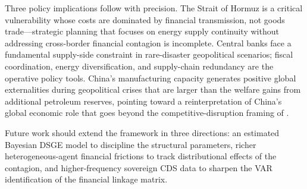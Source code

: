 \documentclass[12pt]{article}
\begin{document}
Three policy implications follow with precision. The Strait of Hormuz is a critical vulnerability whose costs are dominated by financial transmission, not goods trade---strategic planning that focuses on energy supply continuity without addressing cross-border financial contagion is incomplete. Central banks face a fundamental supply-side constraint in rare-disaster geopolitical scenarios; fiscal coordination, energy diversification, and supply-chain redundancy are the operative policy tools. China's manufacturing capacity generates positive global externalities during geopolitical crises that are larger than the welfare gains from additional petroleum reserves, pointing toward a reinterpretation of China's global economic role that goes beyond the competitive-disruption framing of \citet{autor2013china}.

Future work should extend the framework in three directions: an estimated Bayesian DSGE model to discipline the structural parameters, richer heterogeneous-agent financial frictions to track distributional effects of the contagion, and higher-frequency sovereign CDS data to sharpen the VAR identification of the financial linkage matrix.



\newpage

\end{document}

